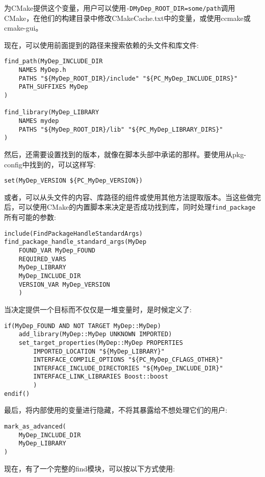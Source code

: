为CMake提供这个变量，用户可以使用\texttt{-DMyDep\_ROOT\_DIR=some/path}调用CMake，在他们的构建目录中修改CMakeCache.txt中的变量，或使用ccmake或cmake-gui。

现在，可以使用前面提到的路径来搜索依赖的头文件和库文件:

\begin{lstlisting}[style=styleCMake]
find_path(MyDep_INCLUDE_DIR
	NAMES MyDep.h
	PATHS "${MyDep_ROOT_DIR}/include" "${PC_MyDep_INCLUDE_DIRS}"
	PATH_SUFFIXES MyDep
)

find_library(MyDep_LIBRARY
	NAMES mydep
	PATHS "${MyDep_ROOT_DIR}/lib" "${PC_MyDep_LIBRARY_DIRS}"
)
\end{lstlisting}

然后，还需要设置找到的版本，就像在脚本头部中承诺的那样。要使用从pkg-config中找到的，可以这样写:

\begin{lstlisting}[style=styleCMake]
set(MyDep_VERSION ${PC_MyDep_VERSION})
\end{lstlisting}

或者，可以从头文件的内容、库路径的组件或使用其他方法提取版本。当这些做完后，可以使用CMake的内置脚本来决定是否成功找到库，同时处理\texttt{find\_package}所有可能的参数:

\begin{lstlisting}[style=styleCMake]
include(FindPackageHandleStandardArgs)
find_package_handle_standard_args(MyDep
	FOUND_VAR MyDep_FOUND
	REQUIRED_VARS
	MyDep_LIBRARY
	MyDep_INCLUDE_DIR
	VERSION_VAR MyDep_VERSION
	)
\end{lstlisting}

当决定提供一个目标而不仅仅是一堆变量时，是时候定义了:

\begin{lstlisting}[style=styleCMake]
if(MyDep_FOUND AND NOT TARGET MyDep::MyDep)
	add_library(MyDep::MyDep UNKNOWN IMPORTED)
	set_target_properties(MyDep::MyDep PROPERTIES
		IMPORTED_LOCATION "${MyDep_LIBRARY}"
		INTERFACE_COMPILE_OPTIONS "${PC_MyDep_CFLAGS_OTHER}"
		INTERFACE_INCLUDE_DIRECTORIES "${MyDep_INCLUDE_DIR}"
		INTERFACE_LINK_LIBRARIES Boost::boost
		)
endif()
\end{lstlisting}

最后，将内部使用的变量进行隐藏，不将其暴露给不想处理它们的用户:

\begin{lstlisting}[style=styleCMake]
mark_as_advanced(
	MyDep_INCLUDE_DIR
	MyDep_LIBRARY
)
\end{lstlisting}

现在，有了一个完整的find模块，可以按以下方式使用:

